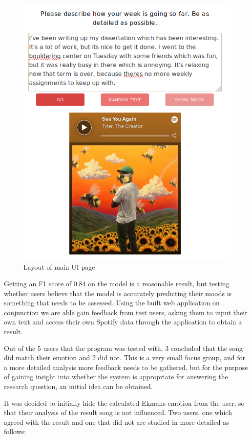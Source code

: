 \begin{figure}[ht]
\centering
\includegraphics[scale=0.4]{implementation/tamara.png}
\caption{Layout of main UI page}
\label{UIlayout}
\end{figure}

Getting an F1 score of 0.84 on the model is a reasonable result, but testing whether users believe that the model is accurately predicting their moods is something that needs to be assessed. Using the built web application on conjunction we are able gain feedback from test users, asking them to input their own text and access their own Spotify data through the application to obtain a result.

Out of the 5 users that the program was tested with, 3 concluded that the song did match their emotion and 2 did not. This is a very small focus group, and for a more detailed analysis more feedback needs to be gathered, but for the purpose of gaining insight into whether the system is appropriate for answering the research question, an initial idea can be obtained.

It was decided to initially hide the calculated Ekmans emotion from the user, so that their analysis of the result song is not influenced. 
Two users, one which agreed with the result and one that did not are studied in more detailed as follows:

